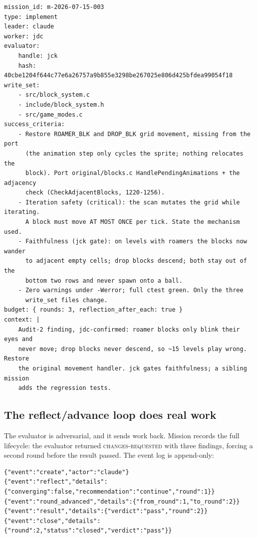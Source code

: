 \documentclass[11pt,a4paper]{article}
\begin{document}
\begin{lstlisting}[caption={The roamer/drop movement contract (excerpt, verbatim)}, label={lst:contract}]
mission_id: m-2026-07-15-003
type: implement
leader: claude
worker: jdc
evaluator:
    handle: jck
    hash: 40cbe1204f644c77e6a26757a9b855e3298be267025e806d425bfdea99054f18
write_set:
    - src/block_system.c
    - include/block_system.h
    - src/game_modes.c
success_criteria:
    - Restore ROAMER_BLK and DROP_BLK grid movement, missing from the port
      (the animation step only cycles the sprite; nothing relocates the
      block). Port original/blocks.c HandlePendingAnimations + the adjacency
      check (CheckAdjacentBlocks, 1220-1256).
    - Iteration safety (critical): the scan mutates the grid while iterating.
      A block must move AT MOST ONCE per tick. State the mechanism used.
    - Faithfulness (jck gate): on levels with roamers the blocks now wander
      to adjacent empty cells; drop blocks descend; both stay out of the
      bottom two rows and never spawn onto a ball.
    - Zero warnings under -Werror; full ctest green. Only the three
      write_set files change.
budget: { rounds: 3, reflection_after_each: true }
context: |
    Audit-2 finding, jdc-confirmed: roamer blocks only blink their eyes and
    never move; drop blocks never descend, so ~15 levels play wrong. Restore
    the original movement handler. jck gates faithfulness; a sibling mission
    adds the regression tests.
\end{lstlisting}

\subsection{The reflect/advance loop does real work}

The evaluator is adversarial, and it sends work back. Mission
 records the full lifecycle: the evaluator
returned \textsc{changes-requested} with three findings, forcing a second
round before the result passed. The event log is append-only:

\begin{lstlisting}[caption={Mission lifecycle events (log.jsonl)}, label={lst:lifecycle}]
{"event":"create","actor":"claude"}
{"event":"reflect","details":{"converging":false,"recommendation":"continue","round":1}}
{"event":"round_advanced","details":{"from_round":1,"to_round":2}}
{"event":"result","details":{"verdict":"pass","round":2}}
{"event":"close","details":{"round":2,"status":"closed","verdict":"pass"}}
\end{lstlisting}
\end{document}
